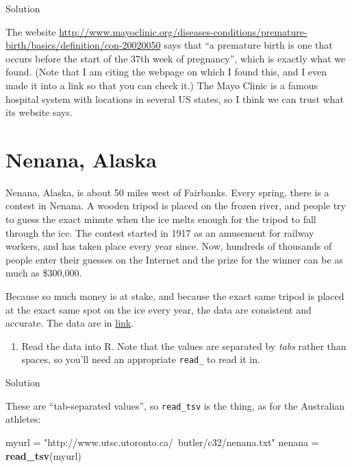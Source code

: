 \documentclass[]{tufte-book}
\newenvironment{Shaded}{}{}
\newcommand{\KeywordTok}[1]{\textcolor[rgb]{0.00,0.44,0.13}{\textbf{#1}}}
\newcommand{\NormalTok}[1]{#1}
\newcommand{\StringTok}[1]{\textcolor[rgb]{0.25,0.44,0.63}{#1}}
\providecommand{\tightlist}{%
  \setlength{\itemsep}{0pt}\setlength{\parskip}{0pt}}
\theoremstyle{definition}
\theoremstyle{definition}
\theoremstyle{definition}
\theoremstyle{remark}
\begin{document}
Solution

The website
\url{http://www.mayoclinic.org/diseases-conditions/premature-birth/basics/definition/con-20020050}
says that ``a premature birth is one that occurs before the start of the
37th week of pregnancy'', which is exactly what we found. (Note that I
am citing the webpage on which I found this, and I even made it into a
link so that you can check it.) The Mayo Clinic is a famous hospital
system with locations in several US states, so I think we can trust what
its website says.

\hypertarget{nenana-alaska}{%
\section{Nenana, Alaska}\label{nenana-alaska}}

Nenana, Alaska, is about 50 miles west of Fairbanks. Every spring, there
is a contest in Nenana. A wooden tripod is placed on the frozen river,
and people try to guess the exact minute when the ice melts enough for
the tripod to fall through the ice. The contest started in 1917 as an
amusement for railway workers, and has taken place every year since.
Now, hundreds of thousands of people enter their guesses on the Internet
and the prize for the winner can be as much as \$300,000.

Because so much money is at stake, and because the exact same tripod is
placed at the exact same spot on the ice every year, the data are
consistent and accurate. The data are in
\href{http://www.utsc.utoronto.ca/~butler/c32/nenana.txt}{link}.

\begin{enumerate}
\def\labelenumi{(\alph{enumi})}
\tightlist
\item
  Read the data into R. Note that the values are separated by
  \emph{tabs} rather than spaces, so you'll need an appropriate
  \texttt{read\_} to read it in.
\end{enumerate}

Solution

These are ``tab-separated values'', so \texttt{read\_tsv} is the thing,
as for the Australian athletes:

\begin{Shaded}
\begin{Highlighting}[]
\NormalTok{myurl =}\StringTok{ "http://www.utsc.utoronto.ca/~butler/c32/nenana.txt"}
\NormalTok{nenana =}\StringTok{ }\KeywordTok{read_tsv}\NormalTok{(myurl)}
\end{Highlighting}
\end{Shaded}
\end{document}
